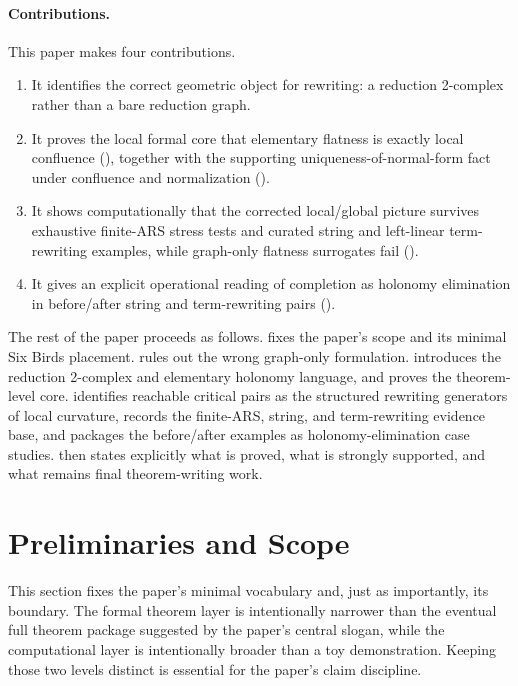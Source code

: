 \documentclass[11pt]{article}
\numberwithin{equation}{section}
\theoremstyle{definition}
\theoremstyle{remark}
\begin{document}
\paragraph{Contributions.}
This paper makes four contributions.
\begin{enumerate}
    \item It identifies the correct geometric object for rewriting: a reduction 2-complex rather than a bare reduction graph.
    \item It proves the local formal core that elementary flatness is exactly local confluence (), together with the supporting uniqueness-of-normal-form fact under confluence and normalization ().
    \item It shows computationally that the corrected local/global picture survives exhaustive finite-ARS stress tests and curated string and left-linear term-rewriting examples, while graph-only flatness surrogates fail ().
    \item It gives an explicit operational reading of completion as holonomy elimination in before/after string and term-rewriting pairs ().
\end{enumerate}

The rest of the paper proceeds as follows.  fixes the paper's scope and its minimal Six Birds placement.  rules out the wrong graph-only formulation.  introduces the reduction 2-complex and elementary holonomy language, and  proves the theorem-level core.  identifies reachable critical pairs as the structured rewriting generators of local curvature,  records the finite-ARS, string, and term-rewriting evidence base, and  packages the before/after examples as holonomy-elimination case studies.  then states explicitly what is proved, what is strongly supported, and what remains final theorem-writing work.
 \section{Preliminaries and Scope}
\label{sec:preliminaries-scope}

This section fixes the paper's minimal vocabulary and, just as importantly, its boundary. The formal theorem layer is intentionally narrower than the eventual full theorem package suggested by the paper's central slogan, while the computational layer is intentionally broader than a toy demonstration. Keeping those two levels distinct is essential for the paper's claim discipline.
\end{document}
